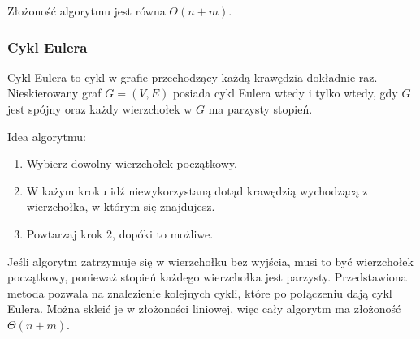 Złożoność algorytmu jest równa \( \Theta(n + m) \).

\subsubsection{Cykl Eulera}
Cykl Eulera to cykl w grafie przechodzący każdą krawędzia dokładnie raz. Nieskierowany graf \( G=(V,E) \) posiada cykl Eulera wtedy i
tylko wtedy, gdy \( G \) jest spójny oraz każdy wierzchołek w \( G \) ma parzysty stopień.

Idea algorytmu:
\begin{enumerate}
    \item Wybierz dowolny wierzchołek początkowy.
    \item W każym kroku idź niewykorzystaną dotąd krawędzią wychodzącą z wierzchołka, w którym się znajdujesz.
    \item Powtarzaj krok 2, dopóki to możliwe.
\end{enumerate}
Jeśli algorytm zatrzymuje się w wierzchołku bez wyjścia, musi to być wierzchołek początkowy, ponieważ stopień każdego wierzchołka jest parzysty.
Przedstawiona metoda pozwala na znalezienie kolejnych cykli, które po połączeniu dają cykl Eulera. Można skleić je w złożoności liniowej, więc cały algorytm ma złożoność \( \Theta(n+m) \). 